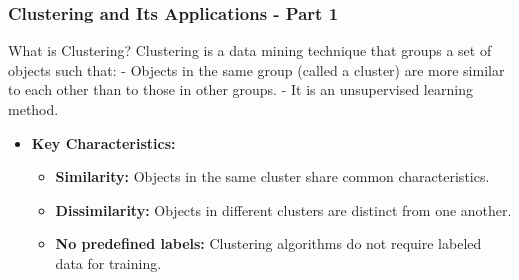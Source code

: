 \documentclass[aspectratio=169]{beamer}
\begin{document}
\begin{frame}[fragile]
    \frametitle{Clustering and Its Applications - Part 1}
    \begin{block}{What is Clustering?}
        Clustering is a data mining technique that groups a set of objects such that:
        - Objects in the same group (called a cluster) are more similar to each other than to those in other groups.
        - It is an unsupervised learning method.
    \end{block}

    \begin{itemize}
        \item \textbf{Key Characteristics:}
        \begin{itemize}
            \item \textbf{Similarity:} Objects in the same cluster share common characteristics.
            \item \textbf{Dissimilarity:} Objects in different clusters are distinct from one another.
            \item \textbf{No predefined labels:} Clustering algorithms do not require labeled data for training.
        \end{itemize}
    \end{itemize}
\end{frame}
\end{document}
